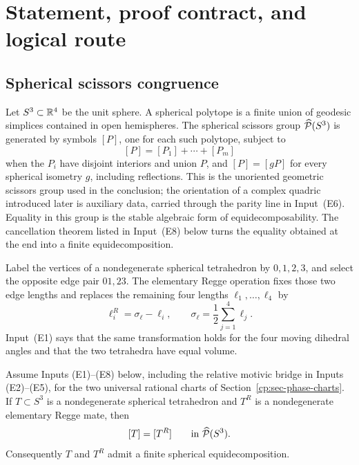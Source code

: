 \section{Statement, proof contract, and logical route}
\label{cp:sec-statement}

\subsection{Spherical scissors congruence}

Let \(S^3\subset\mathbb R^4\) be the unit sphere.  A spherical polytope is a
finite union of geodesic simplices contained in open hemispheres.  The
spherical scissors group \(\widehat{\mathcal P}(S^3)\) is generated by symbols \([P]\),
one for each such polytope, subject to
\[
 [P]=[P_1]+\cdots+[P_m]
\]
when the \(P_i\) have disjoint interiors and union \(P\), and
\([P]=[gP]\) for every spherical isometry \(g\), including reflections.  This
is the unoriented geometric scissors group used in the conclusion; the
orientation of a complex quadric introduced later is auxiliary data, carried
through the parity line in Input~\textup{(E6)}.  Equality in this group is
the stable algebraic form of equidecomposability.  The cancellation theorem
listed in Input~\textup{(E8)} below turns the equality obtained at the end
into a finite equidecomposition.

Label the vertices of a nondegenerate spherical tetrahedron by
\(0,1,2,3\), and select the opposite edge pair \(01,23\).  The elementary
Regge operation fixes those two edge lengths and replaces the remaining
four lengths \(\ell_1,\ldots,\ell_4\) by
\begin{equation}
 \ell_i^R=\sigma_\ell-\ell_i,
 \qquad
 \sigma_\ell=\frac12\sum_{j=1}^4\ell_j.
 \label{cp:eq-regge-lengths}
\end{equation}
Input~\textup{(E1)} says that the same transformation holds for the four
moving dihedral angles and that the two tetrahedra have equal volume.

\begin{theorem}
\label{cp:thm-main}
Assume Inputs \textup{(E1)--(E8)} below, including the relative motivic
bridge in Inputs \textup{(E2)--(E5)}, for the two universal rational charts
of Section~\ref{cp:sec-phase-charts}.  If \(T\subset S^3\) is a
nondegenerate spherical tetrahedron and \(T^R\) is a nondegenerate
elementary Regge mate, then
\[
 [T]=[T^R]\qquad\text{in }\widehat{\mathcal P}(S^3).
\]
Consequently \(T\) and \(T^R\) admit a finite spherical
equidecomposition.
\end{theorem}

